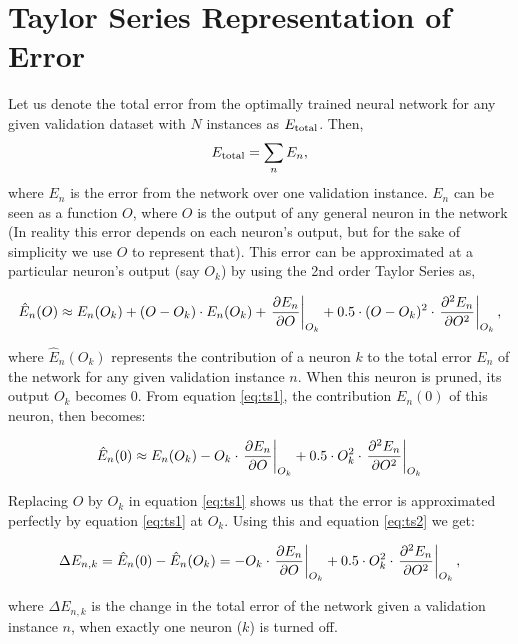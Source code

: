 \section{Taylor Series Representation of Error}
Let us denote the total error from the optimally trained neural network for any given validation dataset with $N$ instances as $E_{\mathrm{total}}$. Then,
\begin{align}
E_{\mathrm{total}} = \sum _n E_n,
\end{align}
where $E_n$ is the error from the network over one validation instance. $E_n$ can be seen as a function $O$, where $O$ is the output of any general neuron in the network (In reality this error depends on each neuron's output, but for the sake of simplicity we use $O$ to represent that). This error can be approximated at a particular neuron's output (say $O_k$) by using the 2nd order Taylor Series as,

\begin{align}
\hat E_n(O) \approx E_n(O_k) + (O-O_k)\cdot E_n(O_k) + \left.\pdv{E_n}{O}\right|_{O_k} +  0.5\cdot (O-O_k)^2\cdot \left.\pdv[2]{E_n}{O}\right|_{O_k}\label{eq:ts1},
\end{align}

where $\hat E_n(O_k)$ represents the contribution of a neuron $k$ to the total error $E_n$ of the network for any given validation instance $n$. When this neuron is pruned, its output $O_k$ becomes 0. From equation \ref{eq:ts1}, the contribution $E_n(0)$ of this neuron, then becomes:

\begin{align}
\hat E_n(0) \approx E_n(O_k) - O_k\cdot \left.\pdv{E_n}{O}\right|_{O_k} +  0.5\cdot O_k^2\cdot \left.\pdv[2]{E_n}{O}\right|_{O_k}\label{eq:ts2}
\end{align}

Replacing $O$ by $O_k$ in equation \ref{eq:ts1} shows us that the error is approximated perfectly by equation \ref{eq:ts1} at $O_k$. Using this and equation \ref{eq:ts2} we get:

\begin{align}
\Delta E_{n,k} = \hat E_n(0) - \hat E_n(O_k)= - O_k\cdot \left.\pdv{E_n}{O}\right|_{O_k} + 0.5\cdot O_k^2\cdot \left.\pdv[2]{E_n}{O}\right|_{O_k},
\end{align}

where $\Delta E_{n,k}$ is the change in the total error of the network given a validation instance $n$, when exactly one neuron ($k$) is turned off.

